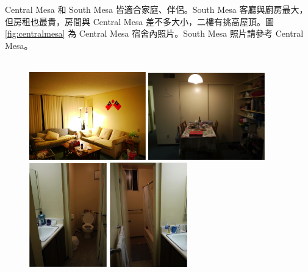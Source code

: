 \documentclass[10pt,a4paper]{book}
\begin{document}
\begin{CJK}{UTF8}{bkai}
\begin{enumerate}
Central Mesa 和 South Mesa 皆適合家庭、伴侶。South Mesa 客廳與廚房最大，但房租也最貴，房間與 Central Mesa 差不多大小，二樓有挑高屋頂。圖 \ref{fig:centralmesa} 為 Central Mesa 宿舍內照片。South Mesa 照片請參考 Central Mesa。
\\
\\

\begin{figure}
\centering
\includegraphics[width=0.45\textwidth]{Pics/central_mesa_1}
\includegraphics[width=0.45\textwidth]{Pics/central_mesa_2}\\
\includegraphics[width=0.3\textwidth]{Pics/central_mesa_5}
\includegraphics[width=0.3\textwidth]{Pics/central_mesa_6}

\end{figure}
\end{enumerate}
\end{CJK}
\end{document}
